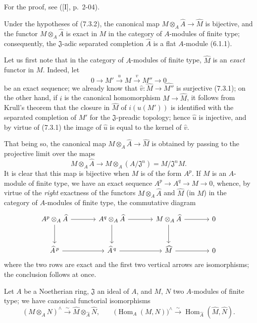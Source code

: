 For the proof, see ([I], p.~2-04).


\begin{corollary}[7.3.3]
\label{0.7.3.3}
Under the hypotheses of (7.3.2), the canonical map
$M\otimes_A\widehat A\to\widehat M$ is bijective, and the functor
$M\otimes_A\widehat A$ is exact in $M$ in the category of $A$-modules of
finite type; consequently, the $\mathfrak J$-adic separated completion $\widehat A$
is a flat $A$-module (6.1.1).
\end{corollary}

Let us first note that in the category of $A$-modules of finite type,
$\widehat M$ is an \emph{exact} functor in $M$. Indeed, let
\[
  0\to M'\xrightarrow{u}M\xrightarrow{v}M''\to0
\]
be an exact sequence; we already know that
$\widehat v:\widehat M\to\widehat{M''}$ is surjective (7.3.1); on the other hand,
if $i$ is the canonical homomorphism $M\to\widehat M$, it follows from Krull's
theorem that the closure in $\widehat M$ of $i(u(M'))$ is identified with the separated
completion of $M'$ for the $\mathfrak J$-preadic topology; hence
$\widehat u$ is injective, and by virtue of (7.3.1) the image of $\widehat u$ is
equal to the kernel of $\widehat v$.

That being so, the canonical map $M\otimes_A\widehat A\to\widehat M$
is obtained by passing to the projective limit over the maps
\[
  M\otimes_A\widehat A\to
  M\otimes_A(A/\mathfrak J^n)=M/\mathfrak J^nM.
\]
It is clear that this map is bijective when $M$ is of the form
$A^p$. If $M$ is an $A$-module of finite type, we have an exact sequence
$A^p\to A^q\to M\to0$, whence, by virtue of the \emph{right} exactness of the
functors $M\otimes_A\widehat A$ and $\widehat M$ (in $M$) in the category
of $A$-modules of finite type, the commutative diagram
\[
\begin{tikzcd}[column sep=large,row sep=large]
  A^p\otimes_A\widehat A \arrow[r] \arrow[d] &
  A^q\otimes_A\widehat A \arrow[r] \arrow[d] &
  M\otimes_A\widehat A \arrow[r] \arrow[d] &
  0 \\
  \widehat A^{\,p} \arrow[r] &
  \widehat A^{\,q} \arrow[r] &
  \widehat M \arrow[r] &
  0
\end{tikzcd}
\]
where the two rows are exact and the first two vertical arrows are
isomorphisms; the conclusion follows at once.

\begin{corollary}[7.3.4]
\label{0.7.3.4}
Let $A$ be a Noetherian ring, $\mathfrak J$ an ideal of $A$, and $M$, $N$ two
$A$-modules of finite type; we have canonical functorial isomorphisms
\[
  (M\otimes_A N)^\wedge
  \xrightarrow{\sim}
  \widehat M\otimes_{\widehat A}\widehat N,
  \qquad
  \bigl(\operatorname{Hom}_A(M,N)\bigr)^\wedge
  \xrightarrow{\sim}
  \operatorname{Hom}_{\widehat A}(\widehat M,\widehat N).
\]
\end{corollary}

